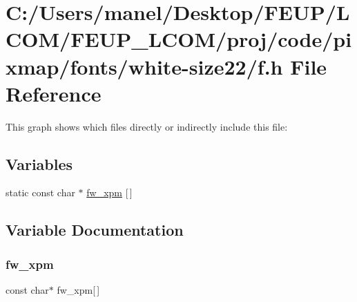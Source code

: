 \hypertarget{white-size22_2f_8h}{}\section{C\+:/\+Users/manel/\+Desktop/\+F\+E\+U\+P/\+L\+C\+O\+M/\+F\+E\+U\+P\+\_\+\+L\+C\+O\+M/proj/code/pixmap/fonts/white-\/size22/f.h File Reference}
\label{white-size22_2f_8h}
This graph shows which files directly or indirectly include this file\+:
\subsection*{Variables}
\begin{DoxyCompactItemize}
\item 
static const char $\ast$ \mbox{\hyperlink{white-size22_2f_8h_a27dfb8d657878bebbe3c0fdc30a41e29}{fw\+\_\+xpm}} \mbox{[}$\,$\mbox{]}
\end{DoxyCompactItemize}


\subsection{Variable Documentation}
\mbox{\label{white-size22_2f_8h_a27dfb8d657878bebbe3c0fdc30a41e29}} 
\subsubsection{\texorpdfstring{fw\_xpm}{fw\_xpm}}
{\footnotesize\ttfamily const char$\ast$ fw\+\_\+xpm\mbox{[}$\,$\mbox{]}\hspace{0.3cm}{\ttfamily [static]}}

